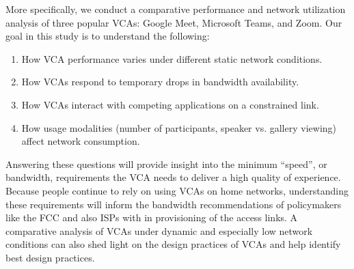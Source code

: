 More specifically, we conduct a comparative performance and network utilization analysis of three popular VCAs: Google Meet, Microsoft Teams, and Zoom. %
Our goal in this study is to understand the following:
\begin{enumerate}
    \item How VCA performance varies under different static network conditions.
    \item How VCAs respond to temporary drops in bandwidth availability.
    \item How VCAs interact with competing applications on a constrained link.
    \item How usage modalities (number of participants, speaker vs. gallery viewing) affect network consumption.
\end{enumerate}

Answering these questions will provide insight into the minimum  ``speed'', or bandwidth, requirements the VCA needs to deliver a high quality of experience. Because people continue to rely on using VCAs on home networks, understanding these requirements will inform the bandwidth recommendations of policymakers like the FCC and also ISPs with in provisioning of the access links. A comparative analysis of VCAs under dynamic and especially low network conditions can also shed light on the design practices of VCAs and help identify best design practices. %

